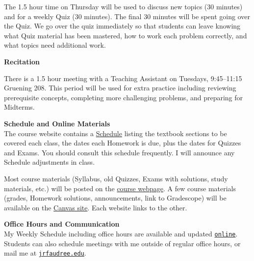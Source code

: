 \documentclass[12pt]{article}
\renewcommand{\emph}[1]{\textsf{\textbf{#1}}}
\newcommand{\localhead}[1]{\par\smallskip\textbf{#1} \smallskip\nobreak\\}%
\def\heading#1{\localhead{\large\emph{#1}}}
\begin{document}
The 1.5 hour time on Thursday will be used to discuss new topics (30 minutes) and for a weekly Quiz (30 minutes).  The final 30 minutes will be spent going over the Quiz.  We go over the quiz immediately so that students can leave knowing what Quiz material has been mastered, how to work each problem correctly, and what topics need additional work. 

\clearpage\newpage

\strut \vspace{-12pt}

\heading{Recitation}

\vspace*{-0.3in}

There is a 1.5 hour meeting with a Teaching Assistant on Tuesdays, 9:45--11:15 Gruening 208. This period will be used for extra practice including reviewing prerequisite concepts, completing more challenging problems, and preparing for Midterms.



\heading{Schedule and Online Materials}
The course website contains a \href{https://docs.google.com/spreadsheets/d/e/2PACX-1vTJV11ILVouSFriJJQo6VS7-qBGvXBt6gtQNPTmmScJuiknursixGxHQf12yrBgwkJqETFn31EgQRia/pubhtml}{Schedule} listing the textbook sections to be covered each class, the dates each Homework is due, plus the dates for Quizzes and Exams. You should consult this schedule frequently.  I will announce any Schedule adjustments in class.

Most course materials (Syllabus, old Quizzes, Exams with solutions, study materials, etc.) will be posted on the \href{https://uaf-math251.github.io/calc2/}{course webpage}.  A few course materials (grades, Homework solutions, announcements, link to Gradescope) will be available on the \href{https://north.open.uaf.edu/login/}{Canvas site}.  Each website links to the other.


\heading{Office Hours and Communication}
My Weekly Schedule including office hours are available and updated \href{https://docs.google.com/spreadsheets/d/e/2PACX-1vSPkx0I1WQikJjmR8qs8wpf2oWcwO8CFS2VwCZYsdusMDkxTIQuOVwcV8LfAtsDtUGoj49xCS1mOIrW/pubhtml}{\texttt{online}}.  Students can also schedule meetings with me outside of regular office hours, or mail me at \href{mailto:jrfaudree@alaska.edu}{\texttt{jrfaudree\@@alaska.edu}}.
\end{document}
